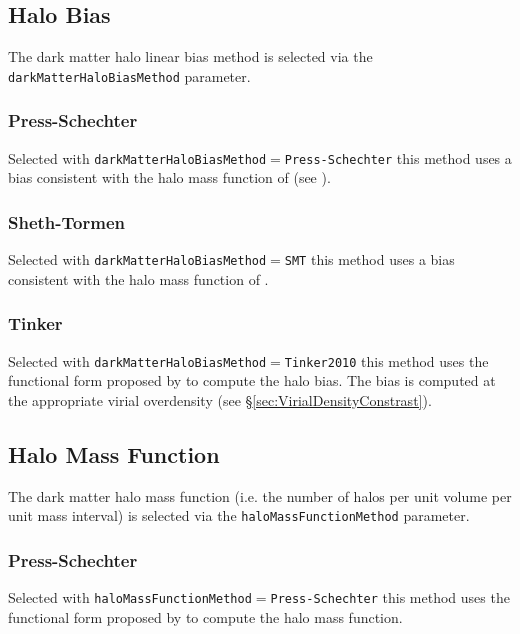 \subsection{Halo Bias}

The dark matter halo linear bias method is selected via the {\tt darkMatterHaloBiasMethod} parameter.

\subsubsection{Press-Schechter}

Selected with {\tt darkMatterHaloBiasMethod}$=${\tt Press-Schechter} this method uses a bias consistent with the halo mass function of \cite{press_formation_1974} (see \citep{mo_analytic_1996}).

\subsubsection{Sheth-Tormen}

Selected with {\tt darkMatterHaloBiasMethod}$=${\tt SMT} this method uses a bias consistent with the halo mass function of \cite{sheth_ellipsoidal_2001}.

\subsubsection{Tinker}

Selected with {\tt darkMatterHaloBiasMethod}$=${\tt Tinker2010} this method uses the functional form proposed by \cite{tinker_large_2010} to compute the halo bias. The bias is computed at the appropriate virial overdensity (see \S\ref{sec:VirialDensityConstrast}).

\subsection{Halo Mass Function}

The dark matter halo mass function (i.e. the number of halos per unit volume per unit mass interval) is selected via the {\tt haloMassFunctionMethod} parameter.

\subsubsection{Press-Schechter}

Selected with {\tt haloMassFunctionMethod}$=${\tt Press-Schechter} this method uses the functional form proposed by \cite{press_formation_1974} to compute the halo mass function.

